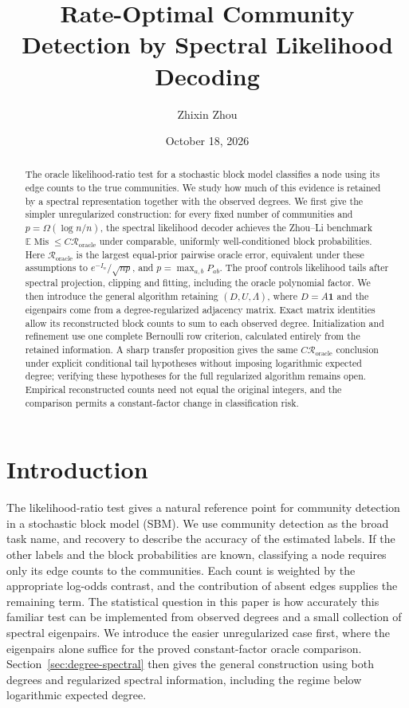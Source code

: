 \documentclass[11pt]{article}
\title{Rate-Optimal Community Detection by Spectral Likelihood Decoding}
\author{Zhixin Zhou}
\date{October 18, 2026}
\theoremstyle{definition}
\theoremstyle{remark}
\newcommand{\Mis}{\operatorname{Mis}}
\newcommand{\Roracle}{\mathcal R_{\mathrm{oracle}}}
\numberwithin{equation}{section}
\begin{document}
\maketitle
\begin{abstract}
The oracle likelihood-ratio test for a stochastic block model classifies a node using its edge counts to the true communities. We study how much of this evidence is retained by a spectral representation together with the observed degrees. We first give the simpler unregularized construction: for every fixed number of communities and $p=\Omega(\log n/n)$, the spectral likelihood decoder achieves the Zhou--Li benchmark $\mathbb E\Mis\le C\Roracle$ under comparable, uniformly well-conditioned block probabilities. Here $\Roracle$ is the largest equal-prior pairwise oracle error, equivalent under these assumptions to $e^{-I_n}/\sqrt{np}$, and $p=\max_{a,b}P_{ab}$. The proof controls likelihood tails after spectral projection, clipping and fitting, including the oracle polynomial factor. We then introduce the general algorithm retaining $(D,U,\Lambda)$, where $D=A\mathbf1$ and the eigenpairs come from a degree-regularized adjacency matrix. Exact matrix identities allow its reconstructed block counts to sum to each observed degree. Initialization and refinement use one complete Bernoulli row criterion, calculated entirely from the retained information. A sharp transfer proposition gives the same $C\Roracle$ conclusion under explicit conditional tail hypotheses without imposing logarithmic expected degree; verifying these hypotheses for the full regularized algorithm remains open. Empirical reconstructed counts need not equal the original integers, and the comparison permits a constant-factor change in classification risk.
\end{abstract}

\section{Introduction}\label{sec:introduction}

The likelihood-ratio test gives a natural reference point for community detection in a stochastic block model (SBM). We use community detection as the broad task name, and recovery to describe the accuracy of the estimated labels. If the other labels and the block probabilities are known, classifying a node requires only its edge counts to the communities. Each count is weighted by the appropriate log-odds contrast, and the contribution of absent edges supplies the remaining term. The statistical question in this paper is how accurately this familiar test can be implemented from observed degrees and a small collection of spectral eigenpairs. We introduce the easier unregularized case first, where the eigenpairs alone suffice for the proved constant-factor oracle comparison. Section~\ref{sec:degree-spectral} then gives the general construction using both degrees and regularized spectral information, including the regime below logarithmic expected degree.
\end{document}
